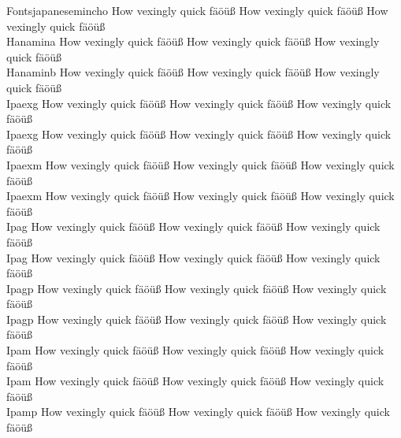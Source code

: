 \begin{tabbing}
Fontsjapanesemincho \> {\mktsStyleNormal{}How vexingly quick fäöüß} {\mktsFontfileFontsjapanesemincho{}How vexingly quick fäöüß} {\mktsStyleItalic{}How vexingly quick fäöüß} \\
Hanamina \> {\mktsStyleNormal{}How vexingly quick fäöüß} {\mktsFontfileHanamina{}How vexingly quick fäöüß} {\mktsStyleItalic{}How vexingly quick fäöüß} \\
Hanaminb \> {\mktsStyleNormal{}How vexingly quick fäöüß} {\mktsFontfileHanaminb{}How vexingly quick fäöüß} {\mktsStyleItalic{}How vexingly quick fäöüß} \\
Ipaexg \> {\mktsStyleNormal{}How vexingly quick fäöüß} {\mktsFontfileIpaexg{}How vexingly quick fäöüß} {\mktsStyleItalic{}How vexingly quick fäöüß} \\
Ipaexg \> {\mktsStyleNormal{}How vexingly quick fäöüß} {\mktsFontfileIpaexg{}How vexingly quick fäöüß} {\mktsStyleItalic{}How vexingly quick fäöüß} \\
Ipaexm \> {\mktsStyleNormal{}How vexingly quick fäöüß} {\mktsFontfileIpaexm{}How vexingly quick fäöüß} {\mktsStyleItalic{}How vexingly quick fäöüß} \\
Ipaexm \> {\mktsStyleNormal{}How vexingly quick fäöüß} {\mktsFontfileIpaexm{}How vexingly quick fäöüß} {\mktsStyleItalic{}How vexingly quick fäöüß} \\
Ipag \> {\mktsStyleNormal{}How vexingly quick fäöüß} {\mktsFontfileIpag{}How vexingly quick fäöüß} {\mktsStyleItalic{}How vexingly quick fäöüß} \\
Ipag \> {\mktsStyleNormal{}How vexingly quick fäöüß} {\mktsFontfileIpag{}How vexingly quick fäöüß} {\mktsStyleItalic{}How vexingly quick fäöüß} \\
Ipagp \> {\mktsStyleNormal{}How vexingly quick fäöüß} {\mktsFontfileIpagp{}How vexingly quick fäöüß} {\mktsStyleItalic{}How vexingly quick fäöüß} \\
Ipagp \> {\mktsStyleNormal{}How vexingly quick fäöüß} {\mktsFontfileIpagp{}How vexingly quick fäöüß} {\mktsStyleItalic{}How vexingly quick fäöüß} \\
Ipam \> {\mktsStyleNormal{}How vexingly quick fäöüß} {\mktsFontfileIpam{}How vexingly quick fäöüß} {\mktsStyleItalic{}How vexingly quick fäöüß} \\
Ipam \> {\mktsStyleNormal{}How vexingly quick fäöüß} {\mktsFontfileIpam{}How vexingly quick fäöüß} {\mktsStyleItalic{}How vexingly quick fäöüß} \\
Ipamp \> {\mktsStyleNormal{}How vexingly quick fäöüß} {\mktsFontfileIpamp{}How vexingly quick fäöüß} {\mktsStyleItalic{}How vexingly quick fäöüß} \\

\end{tabbing}
